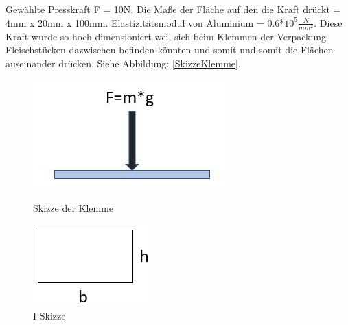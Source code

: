 Gewählte Presskraft F = 10N. Die Maße der Fläche auf den die Kraft drückt = 4mm x 20mm x 100mm. Elastizitätsmodul von Aluminium = 0.6*$10^{5}\frac{N}{mm^{2}}$.
Diese Kraft wurde so hoch dimensioniert weil sich beim Klemmen der Verpackung Fleischstücken dazwischen befinden könnten und somit und somit die Flächen auseinander drücken. Siehe Abbildung: \ref{SkizzeKlemme}.

\begin{figure}[H]
   \begin{minipage}[hbt]{.4\linewidth} %
      \includegraphics[width=\linewidth]{Bilder/Powerpoint/Flaechenkraft}
      \caption{Skizze der Klemme}
      \label{SkizzeKlemme} 
   \end{minipage}
   \hspace{.2\linewidth}%
   \begin{minipage}[hbt]{.3\linewidth} %
      \includegraphics[width=\linewidth]{Bilder/Powerpoint/IBerechnung}
      \caption{I-Skizze}
      \label{I_Skizze}
   \end{minipage}
\end{figure}

